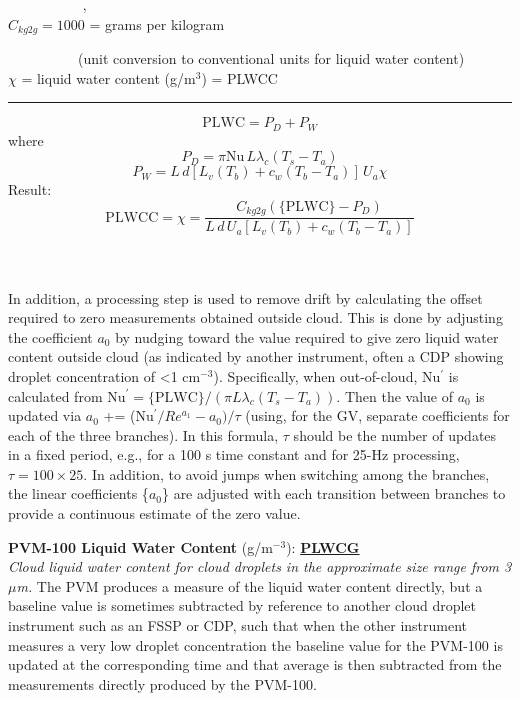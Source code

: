 \begin{hangparagraphs}
{\begin{minipage}[t]{0.95\textwidth}
~~~~~~~~~~%
, \\
$C_{kg2g}=1000$
= grams per kilogram 

~~~~~~~~~~(unit conversion to conventional units for liquid
water content)\\
$\chi$ = liquid water
content (g/m$^{3}$) = PLWCC

\rule[0.5ex]{1\linewidth}{1pt}
\[
\mathrm{PLWC}=P_{D}+P_{W}
\]
where
\[
P_{D}=\pi\mathrm{Nu}\,L\lambda_{c}(T_{s}-T_{a})
\]
\[
P_{W}=L\,d[L_{v}(T_{b})+c_{w}(T_{b}-T_{a})]\,U_{a}\chi
\]
Result:
\[
\mathrm{PLWCC}=\chi=\frac{C_{kg2g}(\mathrm{\{PLWC\}}-P_{D})}{L\,d\,U_{a}[L_{v}(T_{b})+c_{w}(T_{b}-T_{a})]}
\]
%
\end{minipage}}\\
\\
In addition, a processing step is used to remove drift by calculating
the offset required to zero measurements obtained outside cloud. This
is done by adjusting the coefficient $a_{0}$ by nudging toward the
value required to give zero liquid water content outside cloud (as
indicated by another instrument, often a CDP showing droplet concentration
of <1 cm$^{-3}$). Specifically, when out-of-cloud, Nu$^{\prime}$
is calculated from Nu$^{\prime}=\mathrm{\{PLWC\}}/(\pi L\lambda_{c}(T_{s}-T_{a}))$.
Then the value of $a_{0}$ is updated via $a_{0}$ += (Nu$^{\prime}/Re^{a_{1}}-a_{0})/\tau$
(using, for the GV, separate coefficients for each of the three branches).
In this formula, $\tau$ should be the number of updates in a fixed
period, e.g., for a 100 s time constant and for 25-Hz processing,
$\tau=100\times25$. In addition, to avoid jumps when switching among
the branches, the linear coefficients \{$a_{0}$\} are adjusted with
each transition between branches to provide a continuous estimate
of the zero value.

\textbf{PVM-100 Liquid Water Content} (g/m$^{-3}$):\textbf{
}\textbf{\uline{PLWCG}}\textbf{}\\
\emph{Cloud liquid water content for cloud droplets in the approximate
size range from 3 $\mu$m. }The PVM produces a measure
of the liquid water content directly, but a baseline value is sometimes
subtracted by reference to another cloud droplet instrument such as
an FSSP or CDP, such that when the other instrument measures a very
low droplet concentration the baseline value for the PVM-100 is updated
at the corresponding time and that average is then subtracted from
the measurements directly produced by the PVM-100.\label{punch:5-1}


\end{hangparagraphs}
